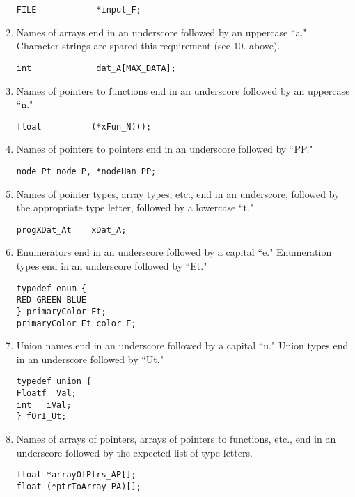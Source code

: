 \begin{enumerate}
\begin{verbatim}
FILE            *input_F;
\end{verbatim}

\item Names of
arrays end in an underscore followed by an
uppercase ``a."  Character strings are spared this requirement (see 10.
above).

\begin{verbatim}
int             dat_A[MAX_DATA];
\end{verbatim}

\item Names of
pointers to functions end in an underscore followed by an uppercase
``n."

\begin{verbatim}
float          (*xFun_N)();
\end{verbatim}

\item Names of pointers to
pointers end in an underscore followed by ``PP."

\begin{verbatim}
node_Pt node_P, *nodeHan_PP;
\end{verbatim}

\item Names of pointer types, array types, etc., end
in an underscore, followed by the appropriate type letter, followed by
a lowercase ``t."

\begin{verbatim}
progXDat_At    xDat_A;
\end{verbatim}

\item Enumerators end in an
underscore followed by a capital ``e."  Enumeration types
end in an underscore followed by ``Et."

\begin{verbatim}
typedef enum {
RED GREEN BLUE
} primaryColor_Et;
primaryColor_Et color_E;
\end{verbatim}

\item Union names end in an underscore
followed by a capital ``u."  Union types end in an
underscore followed by ``Ut."

\begin{verbatim}
typedef union {
Floatf  Val;
int   iVal;
} fOrI_Ut;
\end{verbatim}

\item Names of arrays of pointers,
arrays of pointers  to functions, etc., end in an underscore followed
by the expected list of type letters.

\begin{verbatim}
float *arrayOfPtrs_AP[];
float (*ptrToArray_PA)[];
\end{verbatim}
\end{enumerate}

